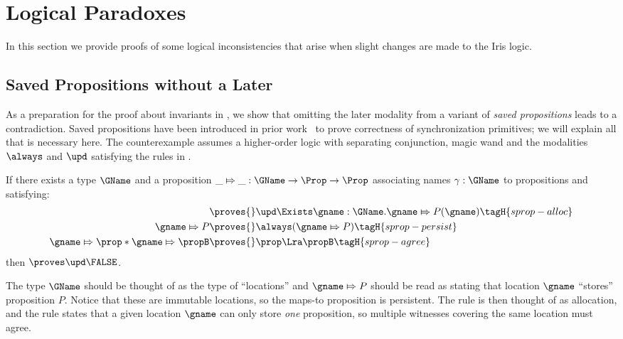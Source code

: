 \section{Logical Paradoxes}
\newcommand{\starttoken}{\textsc{s}}
\newcommand{\finishtoken}{\textsc{f}}

In this section we provide proofs of some logical inconsistencies that arise when slight changes are made to the Iris logic.

\subsection{Saved Propositions without a Later}
\label{sec:saved-prop-no-later}

As a preparation for the proof about invariants in , we show that omitting the later modality from a variant of \emph{saved propositions} leads to a contradiction.
Saved propositions have been introduced in prior work~\cite{dodds:higher-order-sync,iris2} to prove correctness of synchronization primitives; we will explain all that is necessary here.
The counterexample assumes a higher-order logic with separating conjunction, magic wand and the modalities $\always$ and $\upd$ satisfying the rules in .

\begin{thm}
\label{thm:counterexample-1}
If there exists a type $\GName$ and a proposition $\_ \Mapsto \_ : \GName \to \Prop \to \Prop$ associating names $\gamma : \GName$ to propositions and satisfying:
\begin{align}
    \proves{}& \upd \Exists \gname : \GName. \gname \Mapsto P(\gname)
               \tagH{sprop-alloc} \\
    \gname \Mapsto P \proves{}& \always (\gname \Mapsto P)
               \tagH{sprop-persist} \\
    \gname \Mapsto \prop * \gname \Mapsto \propB \proves{}
             &
               \prop \Lra \propB
               \tagH{sprop-agree}
\end{align}
then $\proves\upd \FALSE$.
\end{thm}

The type $\GName$ should be thought of as the type of ``locations'' and $\gname \Mapsto P$ should be read as stating that location $\gname$ ``stores'' proposition $P$.
Notice that these are immutable locations, so the maps-to proposition is persistent.
The rule  is then thought of as allocation, and the rule  states that a given location $\gname$ can only store \emph{one} proposition, so multiple witnesses covering the same location must agree.

